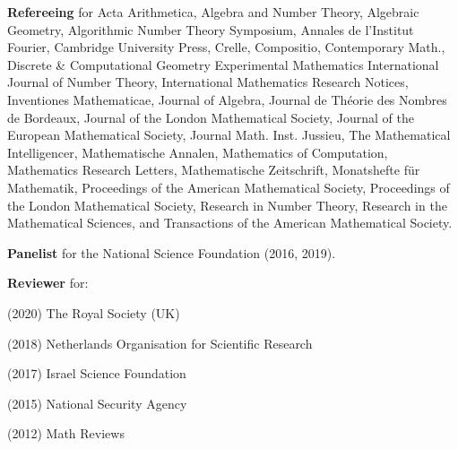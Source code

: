 \documentclass[margin,line]{res}
\newenvironment{list1}{
  \begin{list}{\ding{113}}{%
      \setlength{\itemsep}{0in}
      \setlength{\parsep}{0in} \setlength{\parskip}{0in}
      \setlength{\topsep}{0in} \setlength{\partopsep}{0in}
      \setlength{\leftmargin}{0.17in}}}{\end{list}}
\begin{document}
\begin{resume}
\textbf{Refereeing} for 
Acta Arithmetica,
Algebra and Number Theory, 
Algebraic Geometry,
Algorithmic Number Theory Symposium,  
Annales de l'Institut Fourier,
Cambridge University Press,
Crelle, 
Compositio,
Contemporary Math., 
Discrete \& Computational Geometry
Experimental Mathematics
International Journal of Number Theory, 
International Mathematics Research Notices,
Inventiones Mathematicae, 
Journal of Algebra, 
Journal de  Th\'eorie des Nombres de Bordeaux,
Journal of the London Mathematical Society,
Journal of the European Mathematical Society,
Journal Math. Inst. Jussieu,
The Mathematical Intelligencer, %
Mathematische Annalen,
Mathematics of Computation, 
Mathematics Research Letters, 
Mathematische Zeitschrift, 
Monatshefte für Mathematik,
Proceedings of the American Mathematical Society,
Proceedings of the London Mathematical Society, 
Research in Number Theory, 
Research in the Mathematical Sciences,
and 
Transactions of the American Mathematical Society.


\textbf{Panelist} for the National Science Foundation (2016, 2019).

\vspace{-5pt}
\textbf{Reviewer} for: 
\begin{list1}
\item[] (2020) The Royal Society (UK)
\item[] (2018) Netherlands Organisation for Scientific Research
\item[] (2017) Israel Science Foundation 
\item[] (2015) National Security Agency 
\item[] (2012) Math Reviews
\end{list1}
\vspace{.05in} 



\end{resume}
\end{document}

